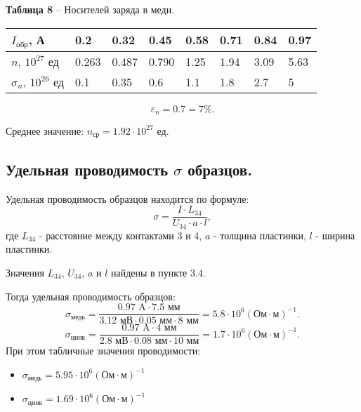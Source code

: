 \documentclass[12pt,a4paper]{article}
\begin{document}
    \begin{table}[!h]
        \begin{flushleft}%
       		\textbf{Таблица 8} -- Носителей заряда в меди.\\
        \end{flushleft}
        \begin{center}
            \begin{tabular}{ | l | l | l | l | l | l | l | l |}
                \hline
                $I_\text{обр}$, А   &   0.2     & 0.32  & 0.45  &   0.58    &   0.71    &   0.84    &   0.97  \\
                \hline
                $n$, $10^{27}$ ед   &   0.263   & 0.487 & 0.790 &   1.25    &   1.94    &   3.09    &   5.63  \\
                \hline    
                $\sigma_n$, $10^{26}$ ед   &   0.1   & 0.35 & 0.6 &   1.1    &   1.8    &   2.7    &   5 \\
                \hline    
            \end{tabular}
        \end{center}
    \end{table}
    \[
    \varepsilon_n = 0.7 = 7\%.
    \]
    
    Среднее значение: $n_\text{ср} = 1.92 \cdot 10^{27}$ ед.
    \subsection{Удельная проводимость $\sigma$ образцов.}
    Удельная проводимость образцов находится по формуле:
    \[
    \sigma = \dfrac{I \cdot L_{34}}{U_{34}\cdot a \cdot l},
    \]
    где $L_{34}$ - расстояние между контактами 3 и 4, $a$ - толщина пластинки, $l$ - ширина пластинки.
    
    Значения $L_{34}$, $U_{34}$, $a$ и $l$ найдены в пункте 3.4. 
    
    Тогда удельная проводимость образцов:
    \[
    \sigma_\text{медь} = \dfrac{0.97 \text{ A} \cdot 7.5 \text{ мм}}{3.12 \text{ мВ}\cdot 0.05 \text{ мм} \cdot 8\text{ мм}} = 5.8 \cdot 10^{6} (\text{Ом}\cdot \text{м})^{-1}.
    \]
    \[
    \sigma_\text{цинк} = \dfrac{0.97 \text{ A} \cdot 4 \text{ мм}}{2.8 \text{ мВ}\cdot 0.08 \text{ мм} \cdot 10\text{ мм}} = 1.7 \cdot 10^{6} (\text{Ом}\cdot \text{м})^{-1}.
    \]
    При этом табличные значения проводимости:
    \begin{itemize}
        \item $\sigma_\text{медь} = 5.95 \cdot 10^{6} (\text{Ом}\cdot \text{м})^{-1}$
        \item $\sigma_\text{цинк} = 1.69 \cdot 10^{6} (\text{Ом}\cdot \text{м})^{-1}$
    \end{itemize}
    
\end{document}
